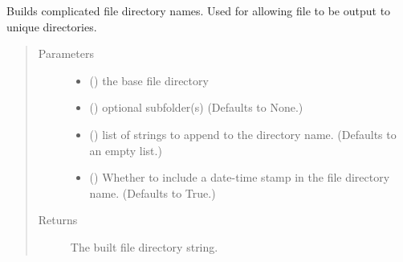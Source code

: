 \documentclass[a4paper,10pt,english]{sphinxmanual}
\begin{document}
\begin{fulllineitems}
\label{\detokenize{io_functions:io_functions.build_filedir}}
Builds complicated file directory names.
Used for allowing file to be output to unique directories.
\begin{quote}\begin{description}
\item[{Parameters}] \leavevmode\begin{itemize}
\item {} 
 () \textendash{} the base file directory

\item {} 
 () \textendash{} optional subfolder(s)
(Defaults to None.)

\item {} 
 () \textendash{} list of strings to append to the directory
name.
(Defaults to an empty list.)

\item {} 
 () \textendash{} Whether to include a date-time stamp in the file
directory  name.
(Defaults to True.)

\end{itemize}

\item[{Returns}] \leavevmode
The built file directory string.

\end{description}\end{quote}

\end{fulllineitems}

\end{document}
